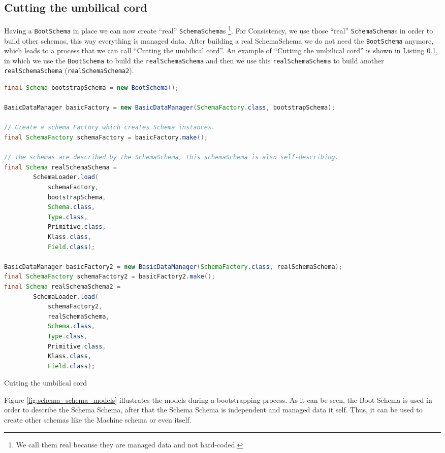 \subsection{Cutting the umbilical cord}\label{subsec:Cutting the umbilical cord}
Having a \texttt{BootSchema} in place we can now create ``real'' \texttt{SchemaSchema}s \footnote{
	We call them real because they are managed data and not hard-coded.}.
For Consistency, we use those ``real'' \texttt{SchemaSchema}s in order to build other schemas, this way everything is managed data.
After building a real SchemaSchema we do not need the \texttt{BootSchema} anymore, which leads to a process that we can call ``Cutting the umbilical cord''.
An example of ``Cutting the umbilical cord'' is shown in Listing \ref{subsec:Cutting the umbilical cord}, in which we use the \texttt{BootSchema} to build the \texttt{realSchemaSchema} and then we use this \texttt{realSchemaSchema} to build another \texttt{realSchemaSchema} (\texttt{realSchemaSchema2}).

\begin{sourcecode} [H]
	\begin{lstlisting}[language=Java, escapechar=|]
final Schema bootstrapSchema = new BootSchema();

BasicDataManager basicFactory = new BasicDataManager(SchemaFactory.class, bootstrapSchema);

// Create a schema Factory which creates Schema instances.
final SchemaFactory schemaFactory = basicFactory.make();

// The schemas are described by the SchemaSchema, this schemaSchema is also self-describing.
final Schema realSchemaSchema =
        SchemaLoader.load(
        	schemaFactory, 
        	bootstrapSchema, 
        	Schema.class, 
        	Type.class, 
        	Primitive.class, 
        	Klass.class, 
        	Field.class);

BasicDataManager basicFactory2 = new BasicDataManager(SchemaFactory.class, realSchemaSchema);
final SchemaFactory schemaFactory2 = basicFactory2.make();
final Schema realSchemaSchema2 =
        SchemaLoader.load(
        	schemaFactory2, 
        	realSchemaSchema, 
        	Schema.class, 
        	Type.class, 
        	Primitive.class, 
        	Klass.class, 
        	Field.class);
	\end{lstlisting}
	\caption{Cutting the umbilical cord}
	\label{lst:Cutting the umbilical cord}
\end{sourcecode}

Figure \ref{fig:schema_schema_models} illustrates the models during a bootstrapping process.
As it can be seen, the Boot Schema is used in order to describe the Schema Schema, after that the Schema Schema is independent and managed data it self.
Thus, it can be used to create other schemas like the Machine schema or even itself.

